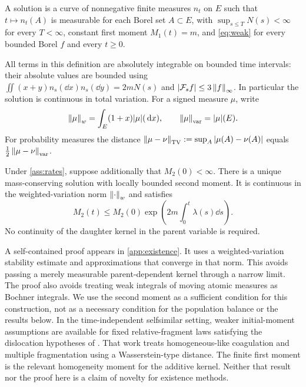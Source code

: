 \begin{definition}\label{def:solution}
A solution is a curve of nonnegative finite measures $n_t$ on $E$ such that
$t\mapsto n_t(A)$ is measurable for each Borel set $A\subset E$,
with $\sup_{s\leq T}N(s)<\infty$ for every $T<\infty$, constant first moment
$M_1(t)=m$, and \eqref{eq:weak} for every bounded Borel $f$ and every $t\geq0$.
\end{definition}

All terms in this definition are absolutely integrable on bounded time
intervals: their absolute values are bounded using
$\iint(x+y)n_s(\dd x)n_s(\dd y)=2mN(s)$ and
$|\mathcal F_s f|\leq3\left\lVert f\right\rVert_\infty$.
In particular the solution is continuous in total variation.
For a signed measure $\mu$, write
\begin{equation}
 \left\lVert \mu\right\rVert_w=\int_E(1+x)|\mu|(\,\mathrm d x),\qquad
 \left\lVert \mu\right\rVert_{\mathrm{var}}=|\mu|(E).
 \label{eq:variation}
\end{equation}
For probability measures the distance
$\left\lVert \mu-\nu\right\rVert_{\mathrm{TV}}:=\sup_A|\mu(A)-\nu(A)|$
equals $\tfrac12\left\lVert \mu-\nu\right\rVert_{\mathrm{var}}$.

\begin{theorem}\label{thm:existence}
Under \cref{ass:rates}, suppose additionally that $M_2(0)<\infty$.
There is a unique mass-conserving solution with locally bounded second
moment. It is continuous in the weighted-variation norm $\left\lVert \cdot\right\rVert_w$
and satisfies
\begin{equation}
 M_2(t)\leq M_2(0)\exp\left(2m\int_0^t\lambda(s)\dd s\right).
 \label{eq:M2bound}
\end{equation}
No continuity of the daughter kernel in the parent variable is required.
\end{theorem}

A self-contained proof appears in \cref{app:existence}. It uses a
weighted-variation stability estimate and approximations that converge in
that norm. This avoids passing a merely measurable parent-dependent kernel
through a narrow limit. The proof also avoids treating weak integrals of
moving atomic measures as Bochner integrals. We use the second moment as a
sufficient condition for this construction, not as a necessary condition for
the population balance or the results below. In the time-independent
selfsimilar setting, weaker initial-moment assumptions are available for
fixed relative-fragment laws satisfying the dislocation hypotheses of
\citet{Cepeda2014}. That work treats homogeneous-like coagulation and
multiple fragmentation using a Wasserstein-type distance. The finite first
moment is the relevant homogeneity moment for the additive kernel. Neither
that result nor the proof here is a claim of novelty for existence methods.


